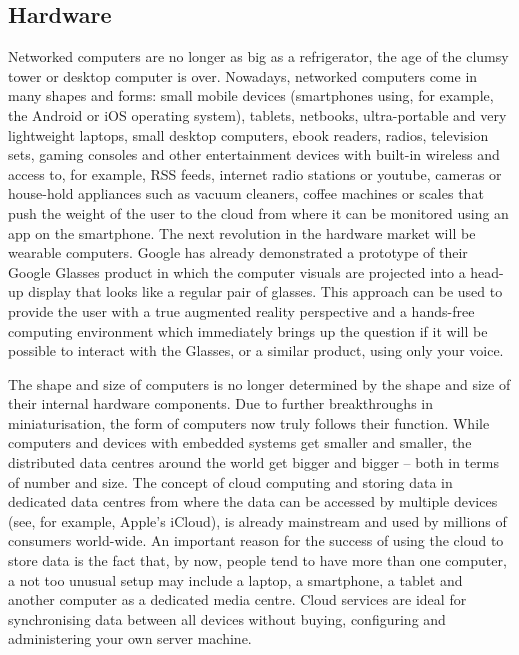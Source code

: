 \documentclass[10pt, plain]{../../metanetpaper}
\begin{document}
\begin{multicols}{2}

\subsection{Hardware}
\label{sec:hardware}

Networked computers are no longer as big as a refrigerator, the age of the clumsy tower or desktop computer is over. Nowadays, networked computers come in many shapes and forms: small mobile devices (smartphones using, for example, the Android or iOS operating system), tablets, netbooks, ultra-portable and very lightweight laptops, small desktop computers, ebook readers, radios, television sets, gaming consoles and other entertainment devices with built-in wireless and access to, for example, RSS feeds, internet radio stations or youtube, cameras or house-hold appliances such as vacuum cleaners, coffee machines or scales that push the weight of the user to the cloud from where it can be monitored using an app on the smartphone. The next revolution in the hardware market will be wearable computers. Google has already demonstrated a prototype of their Google Glasses product in which the computer visuals are projected into a head-up display that looks like a regular pair of glasses. This approach can be used to provide the user with a true augmented reality perspective and a hands-free computing environment which immediately brings up the question if it will be possible to interact with the Glasses, or a similar product, using only your voice.

The shape and size of computers is no longer determined by the shape and size of their internal hardware components. Due to further breakthroughs in miniaturisation, the form of computers now truly follows their function. While computers and devices with embedded systems get smaller and smaller, the distributed data centres around the world get bigger and bigger -- both in terms of number and size. The concept of cloud computing and storing data in dedicated data centres from where the data can be accessed by multiple devices (see, for example, Apple's iCloud), is already mainstream and used by millions of consumers world-wide. An important reason for the success of using the cloud to store data is the fact that, by now, people tend to have more than one computer, a not too unusual setup may include a laptop, a smartphone, a tablet and another computer as a dedicated media centre. Cloud services are ideal for synchronising data between all devices without buying, configuring and administering your own server machine.


\end{multicols}
\end{document}
